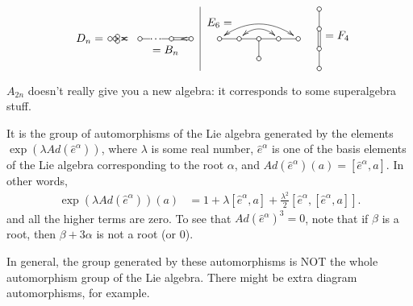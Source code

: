 \[\begin{tabular}{cc|cc}
\begin{xy}
   (0,0) *++!R{D_n=} *\cir<2pt>{};
   p+(.5,0) **@{-};
   p+(.6,0) **{.};
   p+(.5,0)  *\cir<2pt>{} **@{-};
   p+a(45)="a"  *\cir<2pt>{} **@{-},
   p+a(-45)="b"  *\cir<2pt>{} **@{-};
   \ar@{<->}@/^/ "a" *+{\,};"b" *+{\,}
 \end{xy} &
 \begin{xy}<1.75em,0em>:
   (0,0) *\cir<2pt>{};
   p+(.5,0) **@{-};
   p+(.6,0) **{.};
   p+(.5,0) *\cir<2pt>{} **@{-};
   p+(1,0) *\cir<2pt>{} **@{=}?(.5)*@{<};
   (1.3,0) *++!U{=B_n}
  \end{xy} &
  \begin{xy}<1.75em,0em>:
   (0,.8) *{E_6=};
   (0,0)="1" *\cir<2pt>{};
   (1,0)="2"  *\cir<2pt>{} **@{-};
   p+(1,0) *\cir<2pt>{} **@{-};
   p+(0,-1) *\cir<2pt>{} **@{-},
   p+(1,0)="22" *\cir<2pt>{} **@{-};
   p+(1,0)="11" *\cir<2pt>{} **@{-};
   "1" *+{\ };"11" *+{\ } **\crv{(2,1.5)} ?<*@{<} ?>*@{>},
   "2" *+{\ };"22" *+{\ } **\crv{(2,1)} ?<*@{<} ?>*@{>},
 \end{xy} &
 \begin{xy} <1.75em,0em>:
   (0,-1.5) *\cir<2pt>{};
   p+(0,1)  *\cir<2pt>{} **@{-};
   p+(0,1) *\cir<2pt>{} **@{=};
   p+(0,1)  *\cir<2pt>{} **@{-};
 \end{xy} $= F_4$
 \end{tabular}\]

 $A_{2n}$ doesn't really give you a new algebra: it corresponds to some
 superalgebra stuff.

  It is the
 group of automorphisms of the Lie algebra generated by the elements $\exp(\lambda
 Ad(\hat e^\alpha))$, where $\lambda$ is some real number, $\hat e^\alpha$ is one of
 the basis elements of the Lie algebra corresponding to the root $\alpha$, and
 $Ad(\hat e^\alpha)(a) = [\hat e^\alpha, a]$. In other words,
 \begin{align*}
   \exp(\lambda Ad(\hat e^\alpha))(a) &= 1+ \lambda [\hat e^\alpha, a] +
   \frac{\lambda^2}{2} [\hat e^\alpha, [\hat e^\alpha, a]].
 \end{align*}
 and all the higher terms are zero. To see that $Ad(\hat e^\alpha)^3 = 0$, note that
 if $\beta$ is a root, then $\beta+3\alpha$ is not a root (or 0).
 \begin{warning}
   In general, the group generated by these automorphisms is NOT the whole
   automorphism group of the Lie algebra. There might be extra diagram automorphisms,
   for example.
 \end{warning}

